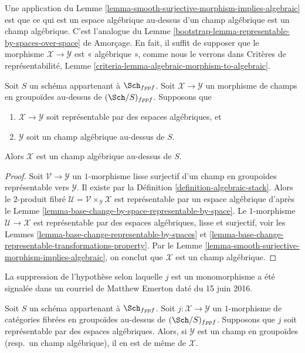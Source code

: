 \noindent
Une application du
Lemme \ref{lemma-smooth-surjective-morphism-implies-algebraic}
est que ce qui est un espace algébrique au-dessus d'un champ algébrique
est un champ algébrique. C'est l'analogue du
Lemme \ref{bootstrap-lemma-representable-by-spaces-over-space} de Amorçage.
En fait, il suffit de supposer que le morphisme
$\mathcal{X} \to \mathcal{Y}$ est « algébrique », comme nous le verrons dans
Critères de représentabilité,
Lemme \ref{criteria-lemma-algebraic-morphism-to-algebraic}.

\begin{lemma}
\label{lemma-representable-morphism-to-algebraic}
Soit $S$ un schéma appartenant à $\Sch_{fppf}$.
Soit $\mathcal{X} \to \mathcal{Y}$ un morphisme de champs en groupoïdes
au-dessus de $(\Sch/S)_{fppf}$. Supposons que
\begin{enumerate}
\item $\mathcal{X} \to \mathcal{Y}$ soit représentable par des espaces algébriques, et
\item $\mathcal{Y}$ soit un champ algébrique au-dessus de $S$.
\end{enumerate}
Alors $\mathcal{X}$ est un champ algébrique au-dessus de $S$.
\end{lemma}

\begin{proof}
Soit $\mathcal{V} \to \mathcal{Y}$ un $1$-morphisme lisse surjectif
d'un champ en groupoïdes représentable vers $\mathcal{Y}$. Il existe par la
Définition \ref{definition-algebraic-stack}.
Alors le $2$-produit fibré
$\mathcal{U} = \mathcal{V} \times_{\mathcal Y} \mathcal X$
est représentable par un espace algébrique d'après le
Lemme \ref{lemma-base-change-by-space-representable-by-space}.
Le $1$-morphisme $\mathcal{U} \to \mathcal X$ est représentable par des espaces
algébriques, lisse et surjectif, voir les
Lemmes \ref{lemma-base-change-representable-by-spaces} et
\ref{lemma-base-change-representable-transformations-property}.
Par le
Lemme \ref{lemma-smooth-surjective-morphism-implies-algebraic},
on conclut que $\mathcal{X}$ est un champ algébrique.
\end{proof}

\begin{lemma}
\label{lemma-open-fibred-category-is-algebraic}
\begin{reference}
La suppression de l'hypothèse selon laquelle $j$ est un monomorphisme a été signalée
dans un courriel de Matthew Emerton daté du 15 juin 2016.
\end{reference}
Soit $S$ un schéma appartenant à $\Sch_{fppf}$.
Soit $j : \mathcal X \to \mathcal Y$ un $1$-morphisme de
catégories fibrées en groupoïdes au-dessus de $(\Sch/S)_{fppf}$.
Supposons que $j$ soit représentable par des espaces algébriques.
Alors, si $\mathcal{Y}$ est un champ en groupoïdes
(resp.\ un champ algébrique), il en est de même de $\mathcal{X}$.
\end{lemma}

